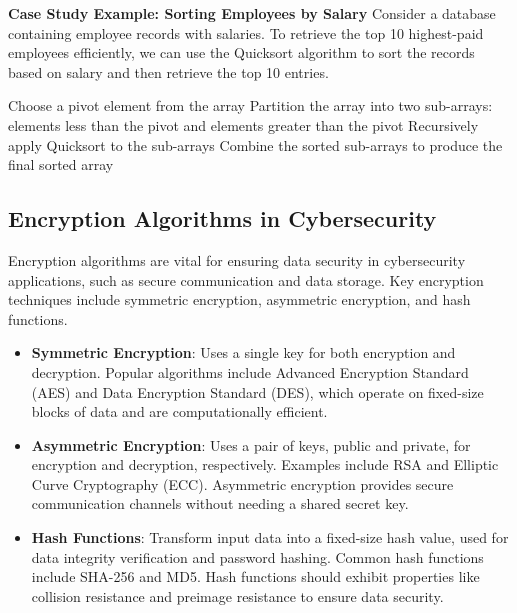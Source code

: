 \documentclass[12pt]{book} %
\begin{document}
\textbf{Case Study Example: Sorting Employees by Salary}
Consider a database containing employee records with salaries. To retrieve the top 10 highest-paid employees efficiently, we can use the Quicksort algorithm to sort the records based on salary and then retrieve the top 10 entries.
\FloatBarrier
\begin{algorithm}
\caption{Quicksort Algorithm For Sorting Employees by Salary}
\begin{algorithmic}[1]
\State Choose a pivot element from the array
\State Partition the array into two sub-arrays: elements less than the pivot and elements greater than the pivot
\State Recursively apply Quicksort to the sub-arrays
\State Combine the sorted sub-arrays to produce the final sorted array
\end{algorithmic}
\end{algorithm}

\FloatBarrier
\subsection{Encryption Algorithms in Cybersecurity}
Encryption algorithms are vital for ensuring data security in cybersecurity applications, such as secure communication and data storage. Key encryption techniques include symmetric encryption, asymmetric encryption, and hash functions.

\begin{itemize}
    \item \textbf{Symmetric Encryption}: Uses a single key for both encryption and decryption. Popular algorithms include Advanced Encryption Standard (AES) and Data Encryption Standard (DES), which operate on fixed-size blocks of data and are computationally efficient.
    
    \item \textbf{Asymmetric Encryption}: Uses a pair of keys, public and private, for encryption and decryption, respectively. Examples include RSA and Elliptic Curve Cryptography (ECC). Asymmetric encryption provides secure communication channels without needing a shared secret key.
    
    \item \textbf{Hash Functions}: Transform input data into a fixed-size hash value, used for data integrity verification and password hashing. Common hash functions include SHA-256 and MD5. Hash functions should exhibit properties like collision resistance and preimage resistance to ensure data security.
\end{itemize}
\end{document}

